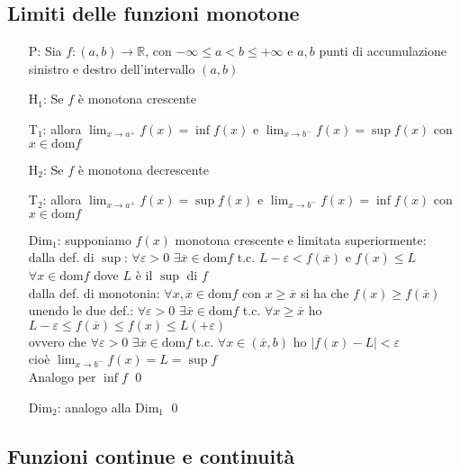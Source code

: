 \documentclass[a4paper]{article}
\newcommand\dom{\text{dom}}
\begin{document}
\subsection{Limiti delle funzioni monotone}
\begin{itemize}
	\item[P:] Sia \(f: \left(a,b\right) \to \mathbb{R}\), con \(-\infty \leq a < b \leq + \infty\) e 
	\(a, b\) punti di accumulazione sinistro e destro dell'intervallo \(\left(a,b\right)\)
	\item[H\(_1\):] Se \(f\) è monotona crescente
	\item[T\(_1\):] allora \(\displaystyle \lim_{x \to a^+} f(x) = \inf f(x)\) e \(\displaystyle \lim_{x \to b^-} f(x) = \sup f(x)\) con \(x \in \dom f\)
	\item[H\(_2\):] Se \(f\) è monotona decrescente
	\item[T\(_2\):] allora \(\displaystyle \lim_{x \to a^+} f(x) = \sup f(x)\) e \(\displaystyle \lim_{x \to b^-} f(x) = \inf f(x)\) con \(x \in \dom f\)
	\item[Dim\(_1\):] supponiamo \(f(x)\) monotona crescente e limitata superiormente: \\
	dalla def. di \(\sup\): \(\forall \varepsilon > 0\) \(\exists \overline{x} \in \dom f\) t.c. \(L - \varepsilon < f(\overline{x})\) e \(f(x) \leq L\) \(\forall x \in \dom f\) dove \(L\) è il \(\sup\) di \(f\) \\
	dalla def. di monotonia: \(\forall x, \overline{x} \in \dom f\) con \(x \geq \overline{x}\) si ha che \(f(x) \geq f(\overline{x})\) \\
	unendo le due def.: \(\forall \varepsilon > 0\) \(\exists \overline{x} \in \dom f\) t.c. \(\forall x \geq \overline{x}\) ho \(L - \varepsilon \leq f(\overline{x}) \leq f(x) \leq L (+ \varepsilon)\) \\
	ovvero che \(\forall \varepsilon > 0\) \(\exists \overline{x} \in \dom f\) t.c. \(\forall x \in \left( \overline{x}, b \right)\) ho \(\left| f(x) - L \right| < \varepsilon\) \\
	cioè \(\displaystyle \lim_{x \to b^-} f(x) = L = \sup f\) \\
	Analogo per \(\inf f\) \qed
	\item[Dim\(_2\):] analogo alla Dim\(_1\) \qed
\end{itemize}

\newpage

\subsection{Funzioni continue e continuità}
\end{document}
